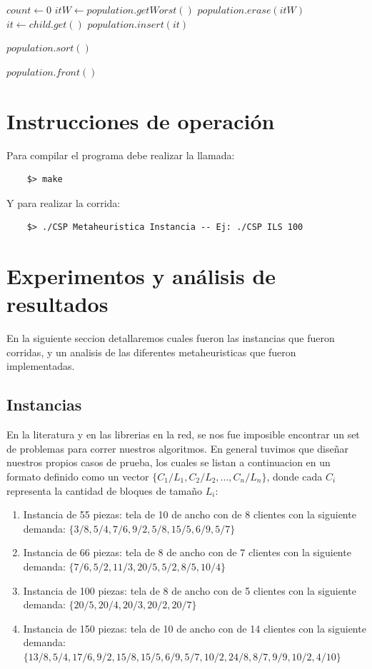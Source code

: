 \documentclass[letterpaper,11pt]{article}
\begin{document}
\begin{center}
\begin{algorithmic}
    \STATE $count \gets 0$
	    \STATE $itW \gets population.getWorst()$
      	\STATE $population.erase(itW)$
		\STATE $it \gets child.get()$
		\STATE $population.insert(it)$	
    \ENDWHILE
    
\ENDWHILE

\STATE $population.sort()$
  
\RETURN $population.front()$

\end{algorithmic}
\end{center}

\section{Instrucciones de operaci\'on}

Para compilar el programa debe realizar la llamada:
\begin{verbatim}
    $> make
\end{verbatim}
Y para realizar la corrida:
\begin{verbatim}
    $> ./CSP Metaheuristica Instancia -- Ej: ./CSP ILS 100
\end{verbatim}

\section{Experimentos y an\'alisis de resultados}

En la siguiente seccion detallaremos cuales fueron las instancias que fueron corridas, y un analisis de las
diferentes metaheuristicas que fueron implementadas.

\subsection{Instancias}

En la literatura y en las librerias en la red, se nos fue imposible encontrar un set de problemas para correr
nuestros algoritmos. En general tuvimos que dise\~nar nuestros propios casos de prueba, los cuales se listan a continuacion en un formato definido como un vector $\lbrace C_1/L_1, C_2/L_2, ... , C_n/L_n\rbrace$, donde cada $C_i$ representa la cantidad de bloques de tama\~no $L_i$:

\begin{enumerate}
\item Instancia de 55 piezas: tela de 10 de ancho con de 8 clientes con la siguiente demanda: $\lbrace3/8,5/4,7/6,9/2,5/8,15/5,6/9,5/7\rbrace$
\item Instancia de 66 piezas: tela de 8 de ancho con de 7 clientes con la siguiente demanda: $\lbrace7/6, 5/2, 11/3, 20/5, 5/2, 8/5, 10/4\rbrace$
\item Instancia de 100 piezas: tela de 8 de ancho con de 5 clientes con la siguiente demanda: $\lbrace20/5, 20/4, 20/3, 20/2, 20/7\rbrace$
\item Instancia de 150 piezas: tela de 10 de ancho con de 14 clientes con la siguiente demanda: $\lbrace13/8, 5/4, 17/6, 9/2, 15/8, 15/5, 6/9, 5/7, 10/2, 24/8, 8/7, 9/9, 10/2, 4/10 \rbrace$
\end{enumerate}
\end{document}
